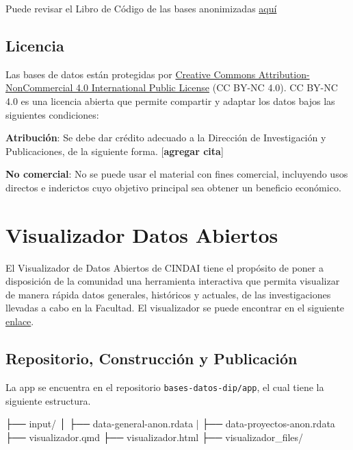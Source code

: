 \documentclass[
  spanish,
  letterpaper,
  DIV=11,
  numbers=noendperiod]{scrreprt}
\newenvironment{Shaded}{\begin{snugshade}}{\end{snugshade}}
\newcommand{\NormalTok}[1]{\textcolor[rgb]{0.00,0.23,0.31}{#1}}
\begin{document}
Puede revisar el Libro de Código de las bases anonimizadas
\href{https://facso-investigacion.github.io/datos-abiertos-dip/codebook.html}{aquí}

\section{Licencia}\label{licencia-1}

Las bases de datos están protegidas por
\href{https://creativecommons.org/licenses/by-nc/4.0/}{Creative Commons
Attribution-NonCommercial 4.0 International Public License} (CC BY-NC
4.0). CC BY-NC 4.0 es una licencia abierta que permite compartir y
adaptar los datos bajos las siguientes condiciones:

\textbf{Atribución}: Se debe dar crédito adecuado a la Dirección de
Investigación y Publicaciones, de la siguiente forma. {[}\textbf{agregar
cita}{]}

\textbf{No comercial}: No se puede usar el material con fines comercial,
incluyendo usos directos e inderictos cuyo objetivo principal sea
obtener un beneficio económico.


\chapter{Visualizador Datos Abiertos}\label{sec-visualizador}

El Visualizador de Datos Abiertos de CINDAI tiene el propósito de poner
a disposición de la comunidad una herramienta interactiva que permita
visualizar de manera rápida datos generales, históricos y actuales, de
las investigaciones llevadas a cabo en la Facultad. El visualizador se
puede encontrar en el siguiente
\href{https://dip-facso.shinyapps.io/datos-abiertos-CINDAI/\#inicio}{enlace}.

\section{Repositorio, Construcción y
Publicación}\label{repositorio-construcciuxf3n-y-publicaciuxf3n-1}

La app se encuentra en el repositorio \texttt{bases-datos-dip/app}, el
cual tiene la siguiente estructura.

\begin{Shaded}
\begin{Highlighting}[]
\NormalTok{├── input/}
\NormalTok{│   ├── data{-}general{-}anon.rdata}
\NormalTok{|   ├── data{-}proyectos{-}anon.rdata}
\NormalTok{├── visualizador.qmd}
\NormalTok{├── visualizador.html}
\NormalTok{├── visualizador\_files/}
\end{Highlighting}
\end{Shaded}
\end{document}
